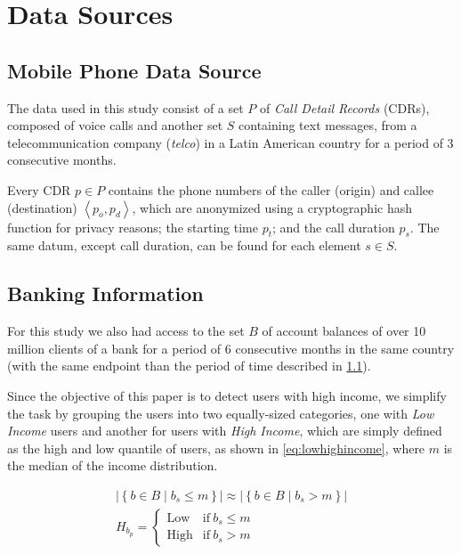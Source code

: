 \section{Data Sources}
\label{sec:data_sources}

\subsection{Mobile Phone Data Source}
\label{subsec:telcoinformation}

The data used in this study consist of a set $P$ of \textit{Call Detail Records} (CDRs), composed of voice calls and another set $S$ containing text messages, from a telecommunication company (\textit{telco}) in a Latin American country for a period of 3 consecutive months.

Every CDR $p \in P$ contains the phone numbers of the caller (origin) and callee (destination) $\left< p_o, p_d \right>$, which are anonymized using a cryptographic hash function for privacy reasons; the starting time \( p_t \); and the call duration \( p_s \). The same datum, except call duration, can be found for each element $s \in S$.

\subsection{Banking Information}

For this study we also had access to the set $B$ of account balances of over 10 million clients of a bank for a period of 6 consecutive months in the same country (with the same endpoint than the period of time described in \cref{subsec:telcoinformation}).

Since the objective of this paper is to detect users with high income, we simplify the task by grouping the users into two equally-sized categories, one with \emph{Low Income} users and another for users with \emph{High Income}, which are simply defined as the high and low quantile of users, as shown in \cref{eq:lowhighincome},
where $m$ is the median of the income distribution.

\begin{equation}
\label{eq:lowhighincome}
\begin{gathered}
	\left| \left\{ b \in B \mid b_s \leq m \right\} \right| \approx \left| \left\{ b \in B \mid b_s > m \right\} \right| \\
	H_{b_p} = \begin{cases} \text{Low} & \text{if} \ b_s \leq m \\ \text{High} & \text{if} \ b_s > m \end{cases}
\end{gathered}
\end{equation}

